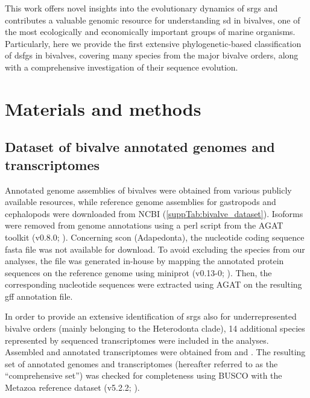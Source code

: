 This work offers novel insights into the evolutionary dynamics of \glspl{srg} and contributes a valuable genomic resource for understanding \gls{sd} in bivalves, one of the most ecologically and economically important groups of marine organisms. Particularly, here we provide the first extensive phylogenetic-based classification of \glspl{dsfg} in bivalves, covering many species from the major bivalve orders, along with a comprehensive investigation of their sequence evolution.

\section{Materials and methods} \label{chapter:molecularEvolution-MM}
\subsection{Dataset of bivalve annotated genomes and transcriptomes}
Annotated genome assemblies of bivalves were obtained from various publicly available resources, while reference genome assemblies for gastropods and cephalopods were downloaded from NCBI (\cref{suppTab:bivalve_dataset}). Isoforms were removed from genome annotations using a perl script from the AGAT toolkit (v0.8.0; ). Concerning \gls{scon} (Adapedonta), the nucleotide coding sequence fasta file was not available for download. To avoid excluding the species from our analyses, the file was generated in-house by mapping the annotated protein sequences on the reference genome using miniprot (v0.13-0; ). Then, the corresponding nucleotide sequences were extracted using AGAT on the resulting gff annotation file.

In order to provide an extensive identification of \glspl{srg} also for underrepresented bivalve orders (mainly belonging to the Heterodonta clade), 14 additional species represented by sequenced transcriptomes were included in the analyses. Assembled and annotated transcriptomes were obtained from  and .
The resulting set of annotated genomes and transcriptomes (hereafter referred to as the “comprehensive set”) was checked for completeness using BUSCO with the Metazoa reference dataset (v5.2.2; ).

